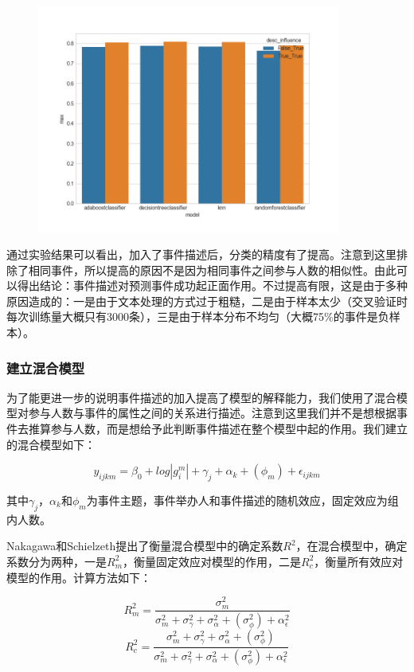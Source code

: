 \begin{figure}
\centering
\includegraphics[width=10cm]{exp4_with_1.png}
\caption{}
\label{f3}
\end{figure}

通过实验结果可以看出，加入了事件描述后，分类的精度有了提高。注意到这里排除了相同事件，所以提高的原因不是因为相同事件之间参与人数的相似性。由此可以得出结论：事件描述对预测事件成功起正面作用。不过提高有限，这是由于多种原因造成的：一是由于文本处理的方式过于粗糙，二是由于样本太少（交叉验证时每次训练量大概只有3000条），三是由于样本分布不均匀（大概75\%的事件是负样本）。

\subsubsection{建立混合模型}

为了能更进一步的说明事件描述的加入提高了模型的解释能力，我们使用了混合模型对参与人数与事件的属性之间的关系进行描述。注意到这里我们并不是想根据事件去推算参与人数，而是想给予此判断事件描述在整个模型中起的作用。我们建立的混合模型如下：

\[
y_{ijkm}=\beta_0+log|g_i^m|+\gamma_j+\alpha_k+ (\phi_m) +\epsilon_{ijkm}
\]

其中\(\gamma_j\)，\(\alpha_k\)和\(\phi_m\)为事件主题，事件举办人和事件描述的随机效应，固定效应为组内人数。

Nakagawa和Schielzeth\cite{nakagawa_ageneralandsimplemethodforobtaining_2013}提出了衡量混合模型中的确定系数\(R^2\)，在混合模型中，确定系数分为两种，一是\(R_m^2\)，衡量固定效应对模型的作用，二是\(R_c^2\)，衡量所有效应对模型的作用。计算方法如下：

\[
R_m^2=\frac{\sigma_m^2}{\sigma_m^2+\sigma_\gamma^2+\sigma_\alpha^2+(\sigma_\phi^2)+\alpha_\epsilon^2}
\] \[
R_c^2=\frac{\sigma_m^2+\sigma_\gamma^2+\sigma_\alpha^2+(\sigma_\phi^2)}{\sigma_m^2+\sigma_\gamma^2+\sigma_\alpha^2+(\sigma_\phi^2)+\alpha_\epsilon^2}
\]

